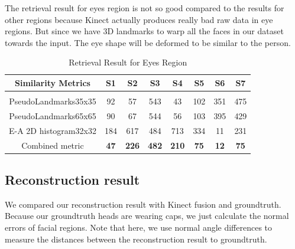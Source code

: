 \documentclass[annual]{acmsiggraph}
\begin{document}
The retrieval result for eyes region is not so good compared to the results for other regions because Kinect actually produces really bad raw data in eye regions. But since we have 3D landmarks to warp all the faces in our dataset towards the input. The eye shape will be deformed to be similar to the person.
\begin{table}[!hbp]
\caption{Retrieval Result for Eyes Region}
\label{similarityeyes}
\begin{center}
\begin{tabular}{cccccccc}
\multicolumn{1}{c}{\bf{Similarity Metrics}} &\multicolumn{1}{c}{S1}  &\multicolumn{1}{c}{S2} &\multicolumn{1}{c}{S3} &\multicolumn{1}{c}{S4}  &\multicolumn{1}{c}{S5} &\multicolumn{1}{c}{S6}   
&\multicolumn{1}{c}{S7} 
\\ \hline \\
PseudoLandmarks35x35 &92 &57 &543 &43 &102 &351 &475\\
PseudoLandmarks65x65 &90 &67 &544 &56 &103 &395 &429\\
E-A 2D histogram32x32    &184  &617 &484 &713 &334 &11 &231\\
Combined metric &\bf{47} &\bf{226} &\bf{482} &\bf{210} &\bf{75} &\bf{12} &\bf{75}\\
\end{tabular}
\end{center}
\end{table}


\subsection{Reconstruction result}
We compared our reconstruction result with Kinect fusion and groundtruth. Because our groundtruth heads are wearing caps, we just calculate the normal errors of facial regions. Note that here, we use normal angle differences to measure the distances between the reconstruction result to groundtruth.
\end{document}
